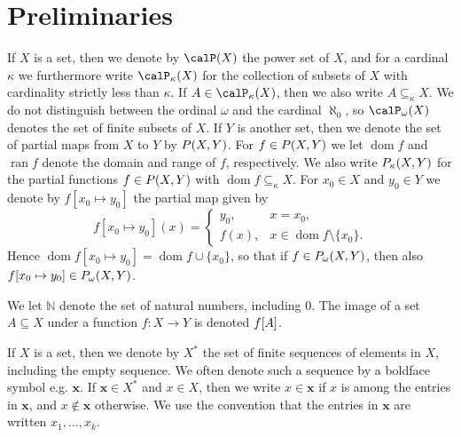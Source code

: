 \documentclass[a4paper, 11pt, article, danish, oneside]{memoir}
\title{\doctitle}
\author{\docauthor}
\newcommand{\naturals}{\mathbb{N}}
\DeclarePairedDelimiter{\auxdelimparen}{(}{)}
\DeclarePairedDelimiter{\auxdelimbracket}{[}{]}
\newcommand{\powerset}[2][]{\calP\auxdelimparen[#1]{#2}}
\newcommand{\powersetcard}[3][]{\calP_{#2}\auxdelimparen[#1]{#3}}
\newcommand{\powersetfin}[2][]{\powersetcard[#1]{\omega}{#2}}
\newcommand*\union\cup
\newcommand{\image}[2][]{\auxdelimbracket[#1]{#2}}
\newcommand{\dom}{\operatorname{dom}}
\newcommand{\ran}{\operatorname{ran}}
\newcommand{\pmaps}[3][]{%
    \ifstrempty{#1}%
        {%
            P(#2,#3)
        }{%
            P_{#1}(#2,#3)
        }%
}
\begin{document}
\maketitle


\chapter{Preliminaries}

If $X$ is a set, then we denote by $\powerset{X}$ the power set of $X$, and for a cardinal $\kappa$ we furthermore write $\powersetcard{\kappa}{X}$ for the collection of subsets of $X$ with cardinality strictly less than $\kappa$. If $A \in \powersetcard{\kappa}{X}$, then we also write $A \subseteq_\kappa X$. We do not distinguish between the ordinal $\omega$ and the cardinal $\aleph_0$, so $\powersetfin{X}$ denotes the set of finite subsets of $X$. If $Y$ is another set, then we denote the set of partial maps from $X$ to $Y$ by $\pmaps{X}{Y}$. For $f \in \pmaps{X}{Y}$ we let $\dom f$ and $\ran f$ denote the domain and range of $f$, respectively. We also write $\pmaps[\kappa]{X}{Y}$ for the partial functions $f \in \pmaps{X}{Y}$ with $\dom f \subseteq_\kappa X$. For $x_0 \in X$ and $y_0 \in Y$ we denote by $f[x_0 \mapsto y_0]$ the partial map given by
%
\begin{equation*}
    f[x_0 \mapsto y_0](x) =
    \begin{cases}
        y_0, & x = x_0, \\
        f(x), & x \in \dom f \setminus \{x_0\}.
    \end{cases}
\end{equation*}
%
Hence $\dom f[x_0 \mapsto y_0] = \dom f \union \{x_0\}$, so that if $f \in \pmaps[\omega]{X}{Y}$, then also $f[x_0 \mapsto y_0] \in \pmaps[\omega]{X}{Y}$.

We let $\naturals$ denote the set of natural numbers, including $0$. The image of a set $A \subseteq X$ under a function $f \colon X \to Y$ is denoted $f\image{A}$.

\newcommand{\seq}[1]{\bm{#1}}
\newcommand{\setOp}{\calO}
\newcommand{\setSort}{\calS}
\newcommand{\sortExp}{\mathit{Exp}}
\newcommand{\sortType}{\mathit{Type}}
\newcommand{\finseq}[1]{#1^*}
\newcommand{\disj}{\mathbin{\#}}

If $X$ is a set, then we denote by $\finseq{X}$ the set of finite sequences of elements in $X$, including the empty sequence. We often denote such a sequence by a boldface symbol e.g. $\seq{x}$. If $\seq{x} \in \finseq{X}$ and $x \in X$, then we write $x \in \seq{x}$ if $x$ is among the entries in $\seq{x}$, and $x \not\in \seq{x}$ otherwise. We use the convention that the entries in $\seq{x}$ are written $x_1, \ldots, x_k$.
\end{document}
